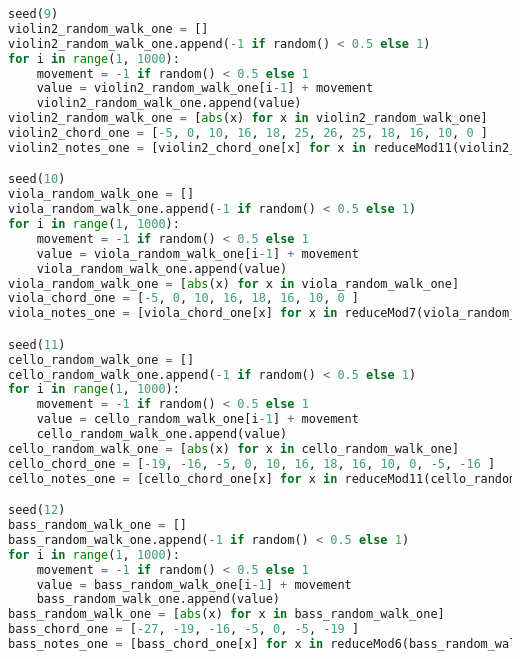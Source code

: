 \begin{lstlisting}[language=Python, caption=Tianshu Segment\_II]
seed(9)
violin2_random_walk_one = []
violin2_random_walk_one.append(-1 if random() < 0.5 else 1)
for i in range(1, 1000):
    movement = -1 if random() < 0.5 else 1
    value = violin2_random_walk_one[i-1] + movement
    violin2_random_walk_one.append(value)
violin2_random_walk_one = [abs(x) for x in violin2_random_walk_one]
violin2_chord_one = [-5, 0, 10, 16, 18, 25, 26, 25, 18, 16, 10, 0 ]
violin2_notes_one = [violin2_chord_one[x] for x in reduceMod11(violin2_random_walk_one)]

seed(10)
viola_random_walk_one = []
viola_random_walk_one.append(-1 if random() < 0.5 else 1)
for i in range(1, 1000):
    movement = -1 if random() < 0.5 else 1
    value = viola_random_walk_one[i-1] + movement
    viola_random_walk_one.append(value)
viola_random_walk_one = [abs(x) for x in viola_random_walk_one]
viola_chord_one = [-5, 0, 10, 16, 18, 16, 10, 0 ]
viola_notes_one = [viola_chord_one[x] for x in reduceMod7(viola_random_walk_one)]

seed(11)
cello_random_walk_one = []
cello_random_walk_one.append(-1 if random() < 0.5 else 1)
for i in range(1, 1000):
    movement = -1 if random() < 0.5 else 1
    value = cello_random_walk_one[i-1] + movement
    cello_random_walk_one.append(value)
cello_random_walk_one = [abs(x) for x in cello_random_walk_one]
cello_chord_one = [-19, -16, -5, 0, 10, 16, 18, 16, 10, 0, -5, -16 ]
cello_notes_one = [cello_chord_one[x] for x in reduceMod11(cello_random_walk_one)]

seed(12)
bass_random_walk_one = []
bass_random_walk_one.append(-1 if random() < 0.5 else 1)
for i in range(1, 1000):
    movement = -1 if random() < 0.5 else 1
    value = bass_random_walk_one[i-1] + movement
    bass_random_walk_one.append(value)
bass_random_walk_one = [abs(x) for x in bass_random_walk_one]
bass_chord_one = [-27, -19, -16, -5, 0, -5, -19 ]
bass_notes_one = [bass_chord_one[x] for x in reduceMod6(bass_random_walk_one)]


\end{lstlisting}

